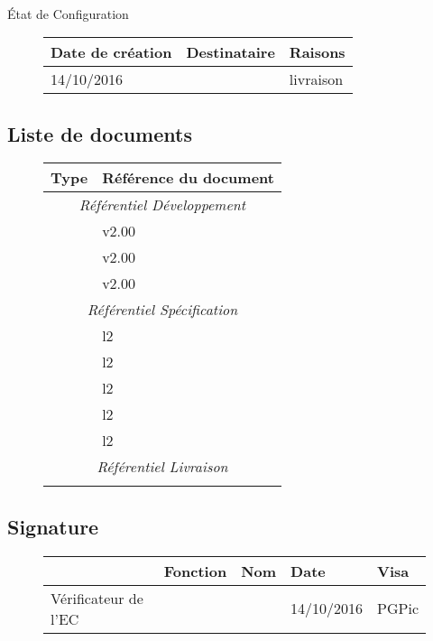 \documentclass[asi, sansVersion]{picInsa}
\begin{document}
\begin{center}
\huge
\nomEquipe{}\\
État de Configuration\\
\end{center}
\vspace{0.5cm}


\begin{figure}[H]
		\centering
		\begin{tabularx}{17cm}{|p{4cm}|X|X|}
		\hline
		\rowcolor[gray]{0.85}Date de création & Destinataire & Raisons \\
		\hline
		14/10/2016 & \client & livraison \\
		\hline
		\end{tabularx}
\end{figure}

\subsection*{Liste de documents}

\begin{figure}[H]
		\centering
		\begin{tabularx}{17cm}{|p{7cm}|X|}
		\hline
		\rowcolor[gray]{0.85}Type & Référence du document\\
		\hline
		\multicolumn{2}{|c|}{\textit{Référentiel Développement}}\\
		\hline 
		 \DSE & v2.00  \\
		 \DSI & v2.00  \\
		 \PTV & v2.00  \\		 	 
		\hline 
		\multicolumn{2}{|c|}{\textit{Référentiel Spécification}}\\
		\hline
		 \PTU & l2 \\
		 \JTU & l2 \\
		 \PTI & l2 \\
		 \JTI & l2 \\
		 \DCP & l2 \\		 	 		 		 		 
		\hline 
		\multicolumn{2}{|c|}{\textit{Référentiel Livraison}}\\
		\hline
		& \\
		\hline 
		\end{tabularx}
\end{figure}

\subsection*{Signature}

\begin{figure}[H]
		\centering
		\begin{tabularx}{17cm}{|p{4cm}|X|X|X|X|}
		\hline
		\rowcolor[gray]{0.85}& Fonction & Nom & Date & Visa \\
		\hline
		 Vérificateur de l'EC & \RGC & \Melissa & 14/10/2016 & PGPic \\
		\hline
		\end{tabularx}
\end{figure}
\end{document}
